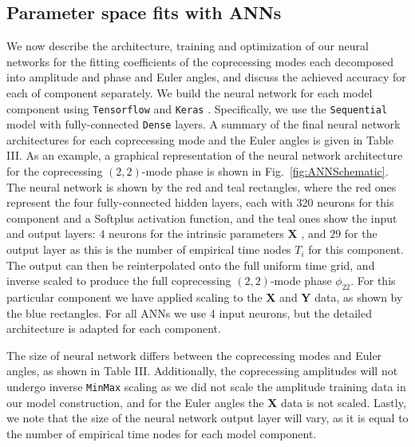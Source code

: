 \documentclass[prd,amssymb,amsmath,amsfonts,superscriptaddress,nofootinbib,reprint,showpacs, longbibliography]{revtex4-1}
\newcommand{\keras}{\texttt{Keras}{ }}
\newcommand{\tensorflow}{\texttt{Tensorflow}{ }}
\newcommand{\minmax}{\texttt{MinMax}{ }}
\newcommand{\Y}{\textbf{Y}{ }}
\newcommand{\X}{\textbf{X}{ }}
\begin{document}
\subsection{Parameter space fits with ANNs}
\label{subsec:ANNs}
We now describe the architecture, training and optimization of our neural networks for the fitting coefficients of the coprecessing modes each decomposed into amplitude and phase and Euler angles, and discuss the achieved accuracy for each of component separately. We build the neural network for each model component using \tensorflow\cite{tensorflow2015-whitepaper} and \keras\cite{chollet2015keras}. Specifically, we use the \texttt{Sequential} model with fully-connected \texttt{Dense} layers.
A summary of the final neural network architectures for each coprecessing mode and the Euler angles is given in Table III. As an example, a graphical representation of the neural network architecture for the coprecessing $(2,2)$-mode phase is shown in Fig.~\ref{fig:ANNSchematic}. The neural network is shown by the red and teal rectangles, where the red ones represent the four fully-connected hidden layers, each with 320 neurons for this component and a Softplus activation function, and the teal ones show the input and output layers: $4$ neurons for the intrinsic parameters \X, and $29$ for the output layer as this is the number of empirical time nodes $T_i$ for this component. The output can then be reinterpolated onto the full uniform time grid, and inverse scaled to produce the full coprecessing $(2,2)$-mode phase $\phi_{22}$. For this particular component we have applied scaling to the \X and \Y data, as shown by the blue rectangles. For all ANNs we use 4 input neurons, but the detailed architecture is adapted for each component. 

The size of neural network differs between the coprecessing modes and Euler angles, as shown in Table III. Additionally, the coprecessing amplitudes will not undergo inverse \minmax scaling as we did not scale the amplitude training data in our model construction, and for the Euler angles the \X data is not scaled. Lastly, we note that the size of the neural network output layer will vary, as it is equal to the number of empirical time nodes for each model component.
\end{document}
